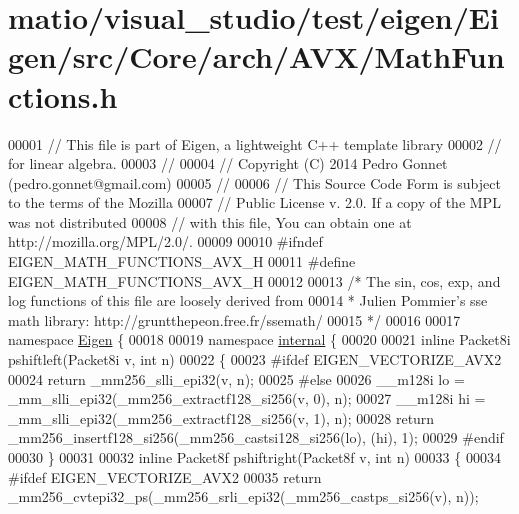 \hypertarget{matio_2visual__studio_2test_2eigen_2_eigen_2src_2_core_2arch_2_a_v_x_2_math_functions_8h_source}{}\section{matio/visual\+\_\+studio/test/eigen/\+Eigen/src/\+Core/arch/\+A\+V\+X/\+Math\+Functions.h}
\label{matio_2visual__studio_2test_2eigen_2_eigen_2src_2_core_2arch_2_a_v_x_2_math_functions_8h_source}

\begin{DoxyCode}
00001 \textcolor{comment}{// This file is part of Eigen, a lightweight C++ template library}
00002 \textcolor{comment}{// for linear algebra.}
00003 \textcolor{comment}{//}
00004 \textcolor{comment}{// Copyright (C) 2014 Pedro Gonnet (pedro.gonnet@gmail.com)}
00005 \textcolor{comment}{//}
00006 \textcolor{comment}{// This Source Code Form is subject to the terms of the Mozilla}
00007 \textcolor{comment}{// Public License v. 2.0. If a copy of the MPL was not distributed}
00008 \textcolor{comment}{// with this file, You can obtain one at http://mozilla.org/MPL/2.0/.}
00009 
00010 \textcolor{preprocessor}{#ifndef EIGEN\_MATH\_FUNCTIONS\_AVX\_H}
00011 \textcolor{preprocessor}{#define EIGEN\_MATH\_FUNCTIONS\_AVX\_H}
00012 
00013 \textcolor{comment}{/* The sin, cos, exp, and log functions of this file are loosely derived from}
00014 \textcolor{comment}{ * Julien Pommier's sse math library: http://gruntthepeon.free.fr/ssemath/}
00015 \textcolor{comment}{ */}
00016 
00017 \textcolor{keyword}{namespace }\hyperlink{namespace_eigen}{Eigen} \{
00018 
00019 \textcolor{keyword}{namespace }\hyperlink{namespaceinternal}{internal} \{
00020 
00021 \textcolor{keyword}{inline} Packet8i pshiftleft(Packet8i v, \textcolor{keywordtype}{int} n)
00022 \{
00023 \textcolor{preprocessor}{#ifdef EIGEN\_VECTORIZE\_AVX2}
00024   \textcolor{keywordflow}{return} \_mm256\_slli\_epi32(v, n);
00025 \textcolor{preprocessor}{#else}
00026   \_\_m128i lo = \_mm\_slli\_epi32(\_mm256\_extractf128\_si256(v, 0), n);
00027   \_\_m128i hi = \_mm\_slli\_epi32(\_mm256\_extractf128\_si256(v, 1), n);
00028   \textcolor{keywordflow}{return} \_mm256\_insertf128\_si256(\_mm256\_castsi128\_si256(lo), (hi), 1);
00029 \textcolor{preprocessor}{#endif}
00030 \}
00031 
00032 \textcolor{keyword}{inline} Packet8f pshiftright(Packet8f v, \textcolor{keywordtype}{int} n)
00033 \{
00034 \textcolor{preprocessor}{#ifdef EIGEN\_VECTORIZE\_AVX2}
00035   \textcolor{keywordflow}{return} \_mm256\_cvtepi32\_ps(\_mm256\_srli\_epi32(\_mm256\_castps\_si256(v), n));

\end{DoxyCode}
